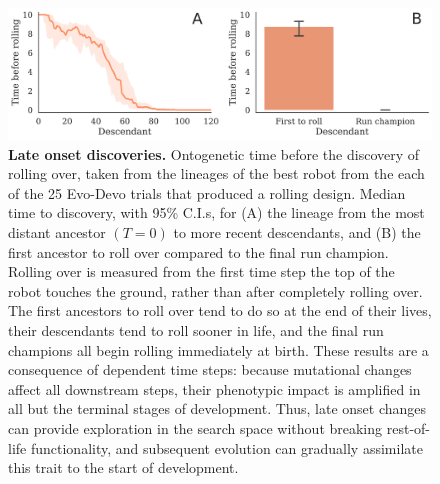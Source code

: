 \begin{figure}
\centering
\includegraphics[width=0.9\linewidth]{Fig6}
\caption{\label{fig-discovery}\textbf{Late onset discoveries.} Ontogenetic time before the discovery of rolling over, taken from the lineages of the best robot from the each of the 25 Evo-Devo trials that produced a rolling design. Median time to discovery, with 95\% C.I.s, for (A) the lineage from the most distant ancestor $(T=0)$ to more recent descendants, and (B) the first ancestor to roll over compared to the final run champion. 
Rolling over is measured from the first time step the top of the robot touches the ground, rather than after completely rolling over. 
The first ancestors to roll over tend to do so at the end of their lives, their descendants tend to roll sooner in life, and the final run champions all begin rolling immediately at birth. 
These results are a consequence of dependent time steps: 
because mutational changes affect all downstream steps, their phenotypic impact is amplified in all but the terminal stages of development. Thus, late onset changes can provide exploration in the search space without breaking rest-of-life functionality, and subsequent evolution can gradually assimilate this trait to the start of development.}
\end{figure}

